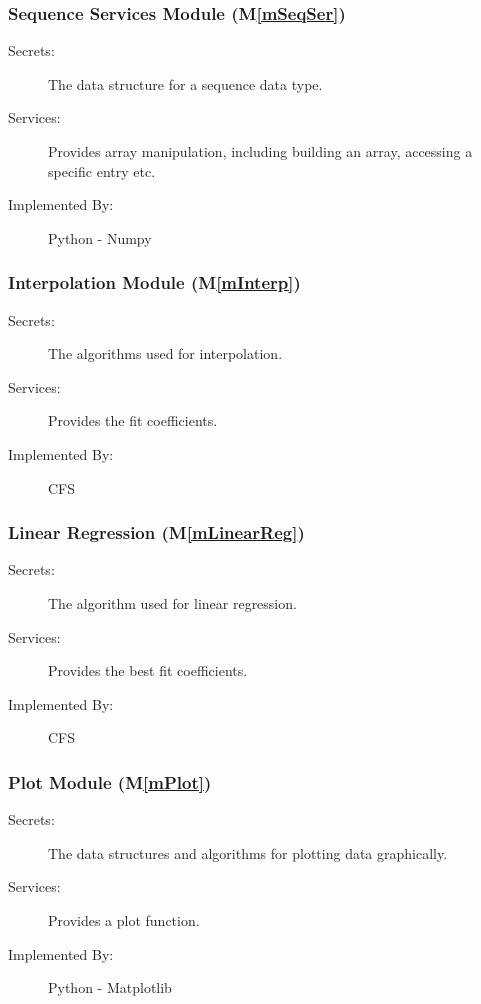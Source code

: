 \documentclass[12pt, titlepage]{article}
\newcommand{\mref}[1]{M\ref{#1}}
\newcommand{\famname}{CFS} %
\begin{document}
\subsubsection{Sequence Services Module  (\mref{mSeqSer})}

\begin{description}
	\item[Secrets:] The data structure for a sequence data type.
	\item[Services:] Provides array manipulation, including building an array,
	accessing a specific entry etc.
	\item[Implemented By:] Python - Numpy
\end{description} 

\subsubsection{Interpolation Module (\mref{mInterp})}

\begin{description}
	\item[Secrets:] The algorithms used for interpolation.
	\item[Services:] Provides the fit coefficients. 
	\item[Implemented By:] \famname{}
\end{description}

\subsubsection{Linear Regression (\mref{mLinearReg})}

\begin{description}
	\item[Secrets:] The algorithm used for linear regression.
	\item[Services:] Provides the best fit coefficients.
	\item[Implemented By:] \famname{}
\end{description}

\subsubsection{Plot Module (\mref{mPlot})}

\begin{description}
	\item[Secrets:] The data structures and algorithms for plotting data graphically.
	\item[Services:] Provides a plot function.
	\item[Implemented By:] Python - Matplotlib
\end{description}
\end{document}
